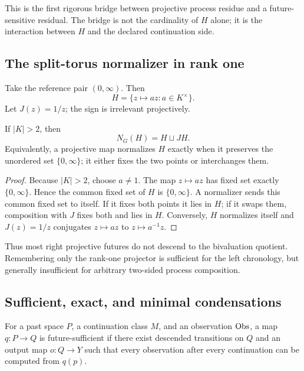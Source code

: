 This is the first rigorous bridge between projective process residue and a
future-sensitive residual.  The bridge is not the cardinality of $H$ alone;
it is the interaction between $H$ and the declared continuation side.

\subsection{The split-torus normalizer in rank one}

Take the reference pair $(0,\infty)$.  Then
\[
  H=\{z\mapsto az:a\in K^\times\}.
\]
Let $J(z)=1/z$; the sign is irrelevant projectively.

\begin{proposition}
\label{prop:split-torus-normalizer}
If $|K|>2$, then
\[
  N_G(H)=H\sqcup JH.
\]
Equivalently, a projective map normalizes $H$ exactly when it preserves the
unordered set $\{0,\infty\}$; it either fixes the two points or interchanges
them.
\end{proposition}

\begin{proof}
Because $|K|>2$, choose $a\ne1$.  The map $z\mapsto az$ has fixed set exactly
$\{0,\infty\}$.  Hence the common fixed set of $H$ is $\{0,\infty\}$.  A
normalizer sends this common fixed set to itself.  If it fixes both points it
lies in $H$; if it swaps them, composition with $J$ fixes both and lies in
$H$.  Conversely, $H$ normalizes itself and $J(z)=1/z$ conjugates
$z\mapsto az$ to $z\mapsto a^{-1}z$.
\end{proof}

Thus most right projective futures do not descend to the bivaluation quotient.
Remembering only the rank-one projector is sufficient for the left chronology,
but generally insufficient for arbitrary two-sided process composition.

\subsection{Sufficient, exact, and minimal condensations}

\begin{definition}
For a past space $P$, a continuation class $M$, and an observation $\operatorname{Obs}$, a
map $q:P\to Q$ is future-sufficient if there exist descended transitions on
$Q$ and an output map $o:Q\to Y$ such that every observation after every
continuation can be computed from $q(p)$.
\end{definition}

